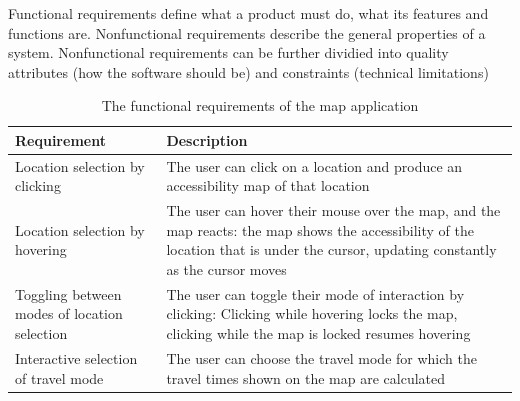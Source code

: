 Functional requirements define what a product must do,
what its features and functions are.
Nonfunctional requirements describe the general properties of a system.
Nonfunctional requirements can be further dividied into quality attributes
(how the software should be) and constraints (technical limitations)

\begin{table}[H]
	\caption{The functional requirements of the map application}
	\label{tab:functional requirements}
	\centering
	\begin{tabular}{ | L{0.3\textwidth} | L{0.6\textwidth} | }
		\hline
		Requirement
		& Description
		\\
		\hline
		\hline
		Location selection by clicking
		& The user can click on a location and produce an accessibility map of that location
		\\
		\hline
		Location selection by hovering
		& The user can hover their mouse over the map, and the map reacts:
		the map shows the accessibility of the location that is under the cursor,
		updating constantly as the cursor moves
		\\
		\hline
		Toggling between modes of location selection
		& The user can toggle their mode of interaction by clicking:
		Clicking while hovering locks the map, clicking while the map is locked resumes hovering
		\\
		\hline
		Interactive selection of travel mode
		& The user can choose the travel mode for which the travel times shown on the map are calculated
		\\
		\hline
	\end{tabular}
\end{table}

